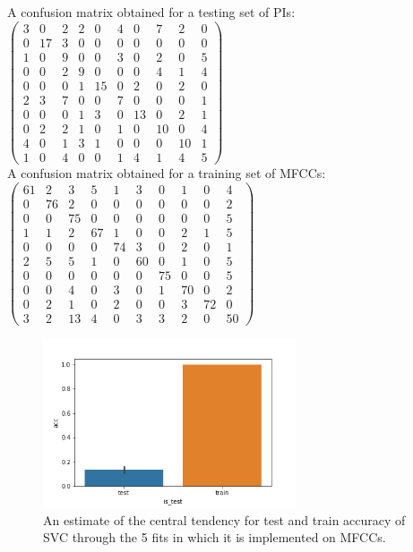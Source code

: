 \documentclass[english, LaM, oneside, noexaminfo]{sapthesis}
\begin{document}
A confusion matrix obtained for a testing set of PIs:\\

$\begin{pmatrix}
3 & 0 & 2 & 2 & 0 & 4 & 0 & 7 & 2 & 0\\
0 & 17 & 3 & 0 & 0 & 0 & 0 & 0 & 0 & 0\\
1 & 0 & 9 & 0 & 0 & 3 & 0 & 2 & 0 & 5\\
0 & 0 & 2 & 9 & 0 & 0 & 0 & 4 & 1 & 4\\
0 & 0 & 0 & 1 & 15 & 0 & 2 & 0 & 2 & 0\\
2 & 3 & 7 & 0 & 0 & 7 & 0 & 0 & 0 & 1\\
0 & 0 & 0 & 1 & 3 & 0 & 13 & 0 & 2 & 1\\
0 & 2 & 2 & 1 & 0 & 1 & 0 & 10 & 0 & 4\\
4 & 0 & 1 & 3 & 1 & 0 & 0 & 0 & 10 & 1\\
1 & 0& 4 & 0 & 0 & 1 & 4 & 1 & 4 & 5
\end{pmatrix}$
\\


A confusion matrix obtained for a training set of MFCCs:\\
$\begin{pmatrix}

61 & 2 & 3& 5 & 1& 3 & 0 & 1 & 0 & 4\\
0 & 76 & 2 & 0 & 0 & 0 & 0 & 0 & 0 & 2\\
0 & 0 & 75 & 0 & 0 & 0 & 0 & 0 & 0 &5\\
1 & 1 & 2 & 67 & 1 & 0 & 0 & 2 & 1 & 5\\
0 & 0 & 0 & 0 & 74 & 3 & 0 & 2 & 0 & 1\\
2 & 5 & 5 & 1 & 0 & 60 & 0 & 1 & 0 & 5\\
0 & 0 & 0  & 0 & 0 & 0 & 75 & 0 & 0 & 5\\
0 & 0 & 4 & 0 & 3 & 0 & 1 & 70 & 0 & 2\\
0 & 2 & 1 & 0 & 2 & 0 & 0 & 3 & 72 & 0\\
3 & 2& 13 & 4 & 0 & 3 & 3 & 2 & 0 & 50

\end{pmatrix}$
\\

\begin{figure}[tb]
\centering
\includegraphics[height=5cm]{mfccs_accuracy_barplot.png}
\caption{An estimate of the central tendency for test and train accuracy of SVC through the 5 fits in which it is implemented on MFCCs.}\label{fig:acc_plot_MFCCs}
\end{figure}
\end{document}
